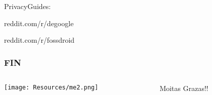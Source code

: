 \documentclass{beamer}
\begin{document}
\begin{frame}
  PrivacyGuides: \quad

  \vspace{1cm}


  \hspace{30pt}reddit.com/r/degoogle \quad
  \hspace{30pt}

  \vspace{0.5cm}

  reddit.com/r/fossdroid \quad

\end{frame}



\begin{frame}
  \frametitle{FIN}

  \begin{columns}
    \begin{column}{0.5\textwidth}
      \texttt{[image: Resources/me2.png]}

    \end{column}

    \begin{column}{0.4\textwidth}

      \LARGE Moitas Grazas!!

      \vspace{1cm}



    \end{column}

  \end{columns}

\end{frame}
\end{document}
